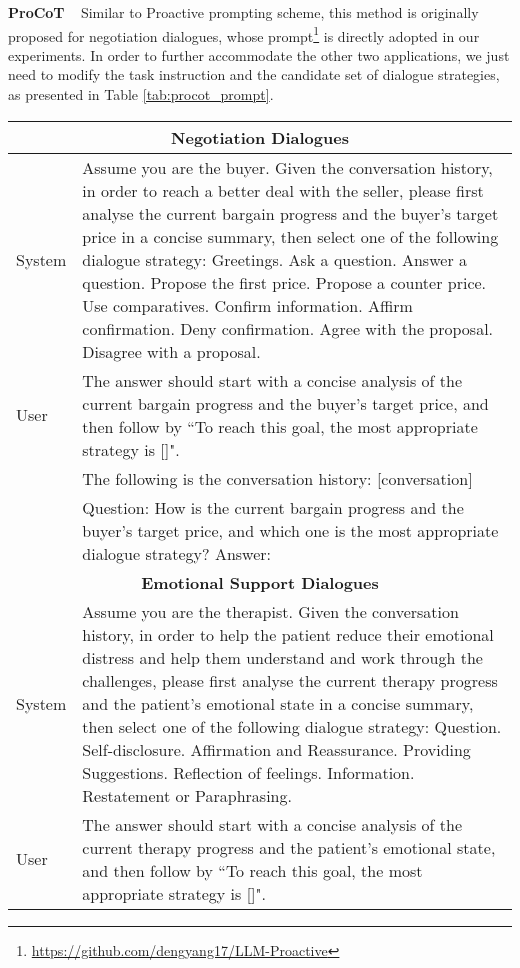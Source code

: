 \documentclass{article} %
\begin{document}
\noindent \textbf{ProCoT} \citep{llm-proactive} ~ 
Similar to Proactive prompting scheme, this method is originally proposed for negotiation dialogues, whose prompt\footnote{\url{https://github.com/dengyang17/LLM-Proactive}} is directly adopted in our experiments. 
In order to further accommodate the other two applications, we just need to modify the task instruction and the candidate set of dialogue strategies, as presented in Table \ref{tab:procot_prompt}. 

\begin{table}[h]
    \centering
    \begin{tabular}{lp{11cm}}
    \toprule
    \multicolumn{2}{c}{\textbf{Negotiation Dialogues}}\\
    \midrule
    System   &  Assume you are the buyer. Given the conversation history, in order to reach a better deal with the seller, please first analyse the current bargain progress and the buyer's target price in a concise summary, then select one of the following dialogue strategy: Greetings. Ask a question. Answer a question. Propose the first price. Propose a counter price. Use comparatives. Confirm information. Affirm confirmation. Deny confirmation. Agree with the proposal. Disagree with a proposal.  \\
    \midrule
    User    &  The answer should start with a concise analysis of the current bargain progress and the buyer's target price, and then follow by ``To reach this goal, the most appropriate strategy is []".\\
    & The following is the conversation history: [conversation]\\
    & Question: How is the current bargain progress and the buyer's target price, and which one is the most appropriate dialogue strategy? Answer:  \\
    \midrule
    \midrule
    \multicolumn{2}{c}{\textbf{Emotional Support Dialogues}}\\
    \midrule
    System   &  Assume you are the therapist. Given the conversation history, in order to help the patient reduce their emotional distress and help them understand and work through the challenges, please first analyse the current therapy progress and the patient's emotional state in a concise summary, then select one of the following dialogue strategy: Question. Self-disclosure. Affirmation and Reassurance. Providing Suggestions. Reflection of feelings. Information. Restatement or Paraphrasing.\\
    \midrule
    User    &  The answer should start with a concise analysis of the current therapy progress and the patient's emotional state, and then follow by ``To reach this goal, the most appropriate strategy is []".\\

\end{tabular}
\end{table}
\end{document}
